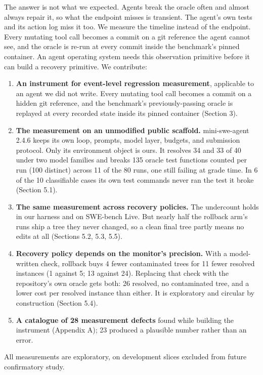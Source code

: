 \documentclass{article}
\begin{document}
The answer is not what we expected. Agents break the oracle often and almost always repair it, so what the endpoint misses is transient. The agent's own tests and its action log miss it too. We measure the timeline instead of the endpoint. Every mutating tool call becomes a commit on a git reference the agent cannot see, and the oracle is re-run at every commit inside the benchmark's pinned container. An agent operating system needs this observation primitive before it can build a recovery primitive. We contribute:

\begin{enumerate}
\item \textbf{An instrument for event-level regression measurement}, applicable to an agent we did not write. Every mutating tool call becomes a commit on a hidden git reference, and the benchmark's previously-passing oracle is replayed at every recorded state inside its pinned container (Section 3).
\item \textbf{The measurement on an unmodified public scaffold.} mini-swe-agent 2.4.6 keeps its own loop, prompts, model layer, budgets, and submission protocol. Only its environment object is ours. It resolves 34 and 33 of 40 under two model families and breaks 135 oracle test functions counted per run (100 distinct) across 11 of the 80 runs, one still failing at grade time. In 6 of the 10 classifiable cases its own test commands never ran the test it broke (Section 5.1).
\item \textbf{The same measurement across recovery policies.} The undercount holds in our harness and on SWE-bench Live. But nearly half the rollback arm's runs ship a tree they never changed, so a clean final tree partly means no edits at all (Sections 5.2, 5.3, 5.5).
\item \textbf{Recovery policy depends on the monitor's precision.} With a model-written check, rollback buys 4 fewer contaminated trees for 11 fewer resolved instances (1 against 5; 13 against 24). Replacing that check with the repository's own oracle gets both: 26 resolved, no contaminated tree, and a lower cost per resolved instance than either. It is exploratory and circular by construction (Section 5.4).
\item \textbf{A catalogue of 28 measurement defects} found while building the instrument (Appendix A); 23 produced a plausible number rather than an error.
\end{enumerate}

All measurements are exploratory, on development slices excluded from future confirmatory study.
\end{document}

